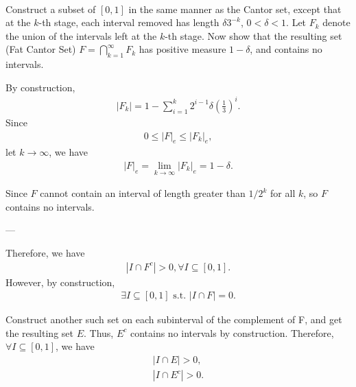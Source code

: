 \documentclass[UTF8,a4paper,10pt]{article}
\begin{document}
  \begin{solution}\,\\

Construct a subset of \([0, 1]\) in the same manner as the Cantor set, except that at the \(k\)-th stage, each interval removed has length \(\delta 3^{-k}\), \(0 < \delta < 1\). Let \(F_k\) denote the union of the intervals left at the \(k\)-th stage.
Now show that the resulting set (Fat Cantor Set) \(F = \bigcap_{k=1}^{\infty} F_k \) has positive measure \(1 - \delta\), and contains no intervals.

By construction,
\begin{equation*}
  \begin{aligned}
    |F_k| = 1 - \sum_{i=1}^{k} 2^{i-1}\delta(\frac{1}{3})^i.
  \end{aligned}
\end{equation*}
Since
\begin{equation*}
  \begin{aligned}
    0\leq|F|_e\leq|F_k|_e,
  \end{aligned}
\end{equation*}
let \(k\to \infty\), we have 
\begin{equation*}
  \begin{aligned}
    |F|_e = \lim_{k \to \infty}|F_k|_e = 1-\delta  .
  \end{aligned}
\end{equation*}

Since \(F\) cannot contain an interval of length greater than \(1/2^k\) for all \(k\), so \(F\) contains no intervals. 

---

Therefore, we have
\begin{equation*}
  \begin{aligned}
    |I\cap F^c| > 0,  \forall I\subseteq[0,1] .
  \end{aligned}
\end{equation*}
However, by construction,
\begin{equation*}
  \begin{aligned}
    \exists I\subseteq[0,1]\text{ s.t. }|I\cap F| = 0.
  \end{aligned}
\end{equation*}

Construct another such set on each subinterval of the complement of F, and get the resulting set \(E\). Thus, \(E^c\) contains no intervals by construction. Therefore, \(\forall I\subseteq[0,1]\), we have
\begin{equation*}
  \begin{aligned}
    |I\cap E| > 0,\\
    |I\cap E^c| > 0.
  \end{aligned}
\end{equation*}

    \end{solution}
\end{document}
